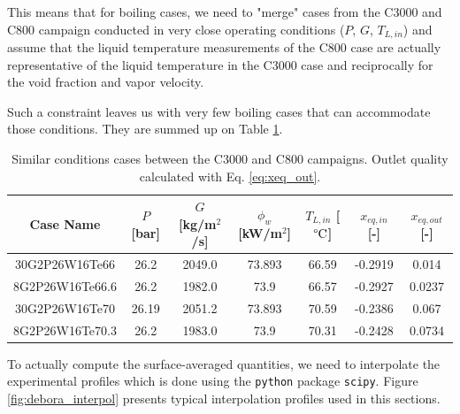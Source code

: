 This means that for boiling cases, we need to "merge" cases from the C3000 and C800 campaign conducted in very close operating conditions ($P$, $G$, $T_{L,in}$) and assume that the liquid temperature measurements of the C800 case are actually representative of the liquid temperature in the C3000 case and reciprocally for the void fraction and vapor velocity.

\npar

Such a constraint leaves us with very few boiling cases that can accommodate those conditions. They are summed up on Table \ref{tab:debora_match_C8C30}.


\begin{table}[!h]
\centering

\begin{tabular}{c||c|c|c|c|c|c}
Case Name & $P$ [bar] & $G$ [kg/m$^{2}$/s]  & $\phi_{w}$ [kW/m$^{2}$]& $T_{L,in}$ [$\degree\mathrm{C}$] & $x_{eq,in}$ [-] & $x_{eq,out}$ [-] \\
\hline
\hline
30G2P26W16Te66  &  26.2  &  2049.0  &  73.893  &  66.59  &  -0.2919  &  0.014 \\
8G2P26W16Te66.6  &  26.2  &  1982.0  &  73.9  &  66.57  &  -0.2927  &  0.0237 \\
\hline 
30G2P26W16Te70  &  26.19  &  2051.2  &  73.893  &  70.59  &  -0.2386  &  0.067 \\
8G2P26W16Te70.3  &  26.2  &  1983.0  &  73.9  &  70.31  &  -0.2428  &  0.0734 \\
\end{tabular}

\caption{Similar conditions cases between the C3000 and C800 campaigns. Outlet quality calculated with Eq. \ref{eq:xeq_out}.}
\label{tab:debora_match_C8C30}
\end{table}


To actually compute the surface-averaged quantities, we need to interpolate the experimental profiles which is done using the \texttt{python} package \texttt{scipy}. Figure \ref{fig:debora_interpol} presents typical interpolation profiles used in this sections.


